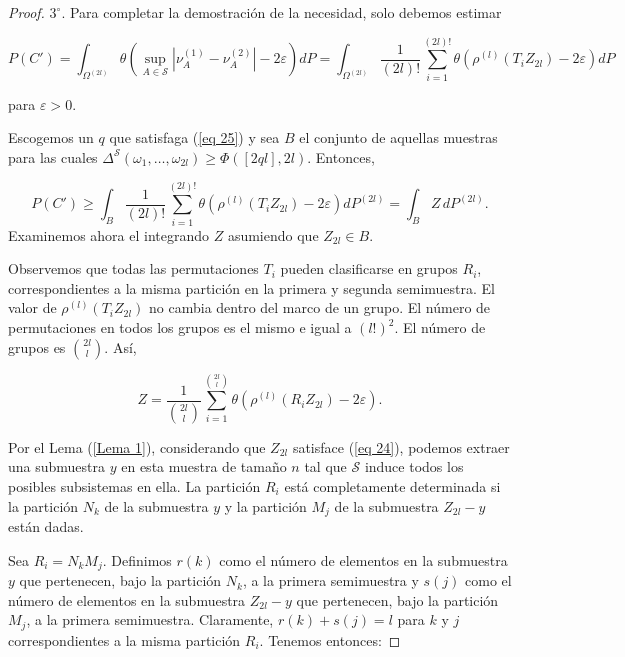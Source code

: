 \documentclass{report}
\begin{document}
\begin{proof}
\( 3^\circ \). Para completar la demostración de la necesidad, solo debemos estimar

\begin{equation*}
P(C') = \int_{\Omega^{(2l)}} \theta \left( \sup_{A \in \mathcal{S}} | \nu_A^{(1)} - \nu_A^{(2)} | - 2\varepsilon \right) dP
= \int_{\Omega^{(2l)}} \frac{1}{(2l)!} \sum_{i=1}^{(2l)!} \theta \left( \rho^{(l)} (T_i Z_{2l}) - 2\varepsilon \right) dP
\end{equation*}

para \( \varepsilon > 0 \).\newline

Escogemos un \( q \) que satisfaga (\ref{eq 25}) y sea \( B \) el conjunto de aquellas muestras para las cuales 
\( \Delta^{\mathcal{S}}(\omega_1, \dots, \omega_{2l}) \geq \Phi([ 2ql ], 2l) \). Entonces,

\begin{equation*}
P(C') \geq \int_B \frac{1}{(2l)!} \sum_{i=1}^{(2l)!} \theta \left( \rho^{(l)} (T_i Z_{2l}) - 2\varepsilon \right) dP^{(2l)}
= \int_B Z \, dP^{(2l)}.
\end{equation*}
Examinemos ahora el integrando \( Z \) asumiendo que \( Z_{2l} \in B \).\newline

Observemos que todas las permutaciones \( T_i \) pueden clasificarse en grupos \( R_i \),
correspondientes a la misma partición en la primera y segunda semimuestra.
El valor de \( \rho^{(l)} (T_i Z_{2l}) \) no cambia dentro del marco de un grupo.
El número de permutaciones en todos los grupos es el mismo e igual a \( (l!)^2 \).
El número de grupos es \( \binom{2l}{l} \). Así, 

\[
Z = \frac{1}{\binom{2l}{l}} \sum_{i=1}^{\binom{2l}{l}} \theta ( \rho^{(l)} (R_i Z_{2l}) - 2\varepsilon ).
\]

Por el Lema (\ref{Lema 1}), considerando que \( Z_{2l} \) satisface (\ref{eq 24}), podemos extraer una submuestra \( y \)
en esta muestra de tamaño \( n \) tal que \( \mathcal{S} \) induce todos los posibles subsistemas en ella.
La partición \( R_i \) está completamente determinada si la partición \( N_k \) de la submuestra \( y \)
y la partición \( M_j \) de la submuestra \( Z_{2l} - y \) están dadas.\newline

Sea \( R_i = N_k M_j \). Definimos \( r(k) \) como el número de elementos en la submuestra \( y \) que pertenecen,
bajo la partición \( N_k \), a la primera semimuestra y \( s(j) \) como el número de elementos en la submuestra
\( Z_{2l} - y \) que pertenecen, bajo la partición \( M_j \), a la primera semimuestra.
Claramente, \( r(k) + s(j) = l \) para \( k \) y \( j \) correspondientes a la misma partición \( R_i \).
Tenemos entonces:


\end{proof}
\end{document}
